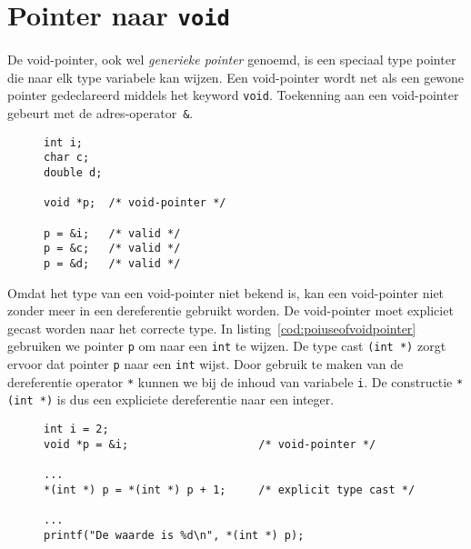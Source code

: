 \section{Pointer naar \texttt{void}}
\label{sec:pointertovoid}

De void-pointer, ook wel \textsl{generieke pointer} genoemd, is een speciaal type pointer die naar elk type variabele kan wijzen. Een void-pointer wordt net als een gewone pointer gedeclareerd middels het keyword \texttt{void}. Toekenning aan een void-pointer gebeurt met de adres-operator~\texttt{\&}.

\begin{figure}[!ht]
\begin{lstlisting}[caption=Declaratie en initialisatie van een void-pointer.]
int i;
char c;
double d;

void *p;  /* void-pointer */

p = &i;   /* valid */
p = &c;   /* valid */
p = &d;   /* valid */
\end{lstlisting}
\end{figure}

Omdat het type van een void-pointer niet bekend is, kan een void-pointer niet zonder meer in een dereferentie gebruikt worden. De void-pointer moet expliciet gecast worden naar het correcte type. In listing~\ref{cod:poiuseofvoidpointer} gebruiken we pointer \texttt{p} om naar een \texttt{int} te wijzen. De type cast \texttt{(int *)} zorgt ervoor dat pointer \texttt{p} naar een \texttt{int} wijst. Door gebruik te maken van de dereferentie operator \texttt{*} kunnen we bij de inhoud van variabele \texttt{i}. De constructie \texttt{*(int *)} is dus een expliciete dereferentie naar een integer.

\begin{figure}[!ht]
\begin{lstlisting}[caption={Declaratie, initialisatie en deference van een void-pointer.},label=cod:poiuseofvoidpointer]
int i = 2;
void *p = &i;                    /* void-pointer */

...
*(int *) p = *(int *) p + 1;     /* explicit type cast */

...
printf("De waarde is %d\n", *(int *) p);
\end{lstlisting}
\end{figure}


